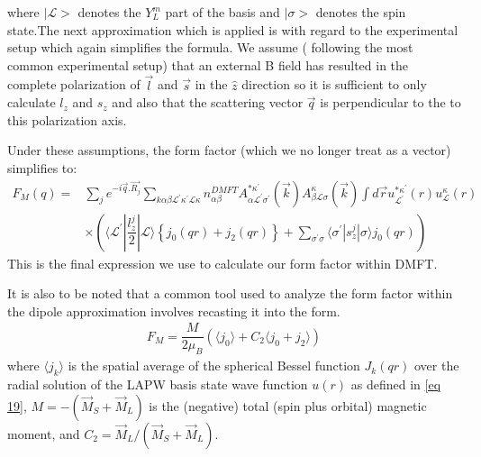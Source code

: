 \documentclass[10pt]{ruthesis}
\begin{document}
{where $|\mathcal{L}>$ denotes the $Y_{L}^{m}$ part of the basis and $|\sigma>$ denotes the spin state.The next approximation which is applied is with regard to the experimental setup which again simplifies the formula. We assume ( following the most common experimental setup) that an external B field has resulted in the complete polarization of $\vec{l}$ and $\vec{s}$ in the $\hat{z}$ direction so it is sufficient to only calculate $l_{z}$ and $s_{z}$ and also that the scattering vector $\vec{q}$ is perpendicular to the to this polarization axis. 

Under these assumptions, the form factor (which we no longer treat as a vector) simplifies to:
\begin{equation} \label{eq 19}
\begin{split}
F_{M}(q)= & \sum_{j} e^{-i\vec{q}.\vec{R_j}}   \sum_{k\alpha \beta \mathcal{L}^{'} \kappa^{'} \mathcal{L}\kappa} n^{DMFT}_{\alpha \beta} A^{* \kappa^{'}}_{\alpha \mathcal{L}^{'} \sigma^{'}}(\vec{k}) A^{ \kappa}_{\beta \mathcal{L}\sigma}(\vec{k}) \int d \vec{r}u_{\mathcal{L^{'}}}^{*\kappa^{'} }(r)u_{\mathcal{L}}^{\kappa}(r) \\
& \times\left( \langle\mathcal{L^{'}}|\dfrac{l_{z}^j}{2}|\mathcal{L}\rangle \left\lbrace  j_{0}(qr) +j_{2}(qr) \right \rbrace + \sum_{\sigma^{'} \sigma} \langle \sigma^{'} |s_{z}^j|\sigma \rangle 
 j_0(qr) \right) 
\end{split}
\end{equation}
This is the final expression we use to calculate our form factor within DMFT.

It is also to be noted that a common tool used to analyze the form factor within the dipole approximation involves recasting it into the  form.
\begin{align}
F_{M}=\dfrac{M}{2 \mu_B} \left( \langle j_{0} \rangle + C_{2} \langle j_{0}+j_{2} \rangle \right) 
\end{align} 
where $\langle j_k \rangle$ is the spatial average of the spherical Bessel function
$J_k(qr)$ over the radial solution of the LAPW basis state wave function $u(r)$ as defined in \ref{eq 19},
$M=-(\vec{M}_S + \vec{M}_L)$ is the (negative) total (spin plus orbital) magnetic moment,
and $C_2 = \vec{M}_L/(\vec{M}_S + \vec{M}_L)$.

}
\end{document}
